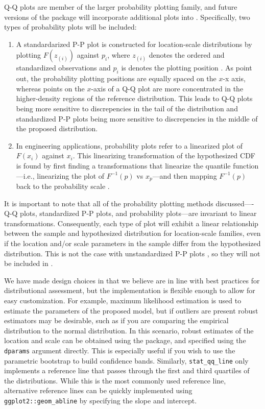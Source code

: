 Q-Q plots are member of the larger probability plotting family, and
future versions of the package will incorporate additional plots into
. Specifically, two types of probability plots will be
included:

\begin{enumerate}
\def\labelenumi{\arabic{enumi}.}
\tightlist
\item
  A standardarized P-P plot is constructed for location-scale
  distributions by plotting \(F(z_{(i)})\) against \(p_i\), where
  \(z_{(i)}\) denotes the ordered and standardized observations and
  \(p_i\) is denotes the plotting position \citep{Gan1991-yk}. As
  \citet{Gan1991-yk} point out, the probability plotting positions are
  equally spaced on the \(x\)-x axis, whereas points on the \(x\)-axis
  of a Q-Q plot are more concentrated in the higher-density regions of
  the reference distribution. This leads to Q-Q plots being more
  sensitive to discrepencies in the tail of the distribution and
  standardized P-P plots being more sensitive to discrepencies in the
  middle of the proposed distribution.
\item
  In engineering applications, probability plots refer to a linearized
  plot of \(F(x_i)\) against \(x_i\). This linearizing transformation of
  the hypothesized CDF is found by first finding a transformations that
  linearize the quantile function---i.e., linearizing the plot of
  \(F^{-1}(p)\) vs \(x_p\)---and then mapping \(F^{-1}(p)\) back to the
  probability scale \citep[cf.][Chapter 6]{Meeker1998}.
\end{enumerate}

It is important to note that all of the probability plotting methods
discussed----Q-Q plots, standardized P-P plots, and probability
plots---are invariant to linear transformations. Consequently, each type
of plot will exhibit a linear relationship between the sample and
hypothesized distribution for location-scale families, even if the
location and/or scale parameters in the sample differ from the
hypothesized distribution. This is not the case with unstandardized P-P
plots \citep{Wilk1968-ii}, so they will not be included in
.

We have made design choices in  that we believe are in line
with best practices for distributional assessment, but the
implementation is flexible enough to allow for easy customization. For
example, maximum likelihood estimation is used to estimate the
parameters of the proposed model, but if outliers are present robust
estimators may be desirable, such as if you are comparing the empirical
distribution to the normal distribution. In this scenario, robust
estimates of the location and scale can be obtained using the
 \citep{robustbase} package, and specified using the
\texttt{dparams} argument directly. This is especially useful if you
wish to use the parametric bootstrap to build confidence bands.
Similarly, \texttt{stat\_qq\_line} only implements a reference line that
passes through the first and third quartiles of the distributions. While
this is the most commonly used reference line, alternative reference
lines can be quickly implemented using \texttt{ggplot2::geom\_abline} by
specifying the slope and intercept.

